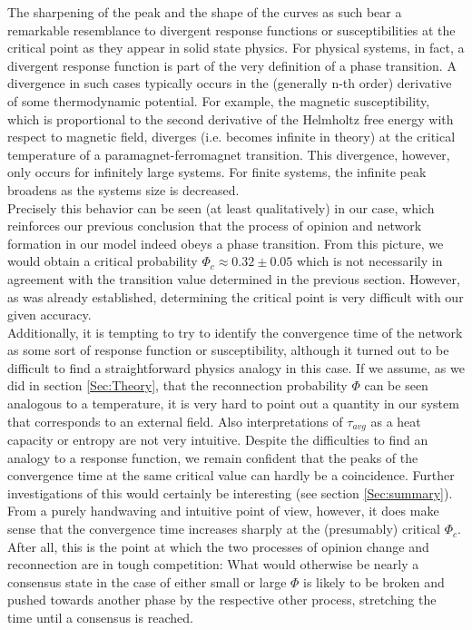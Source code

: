\documentclass[11pt]{article}
\begin{document}
The sharpening of the peak and the shape of the curves as such bear a remarkable resemblance to divergent response functions or susceptibilities at the critical point as they appear in solid state physics. For physical systems, in fact, a divergent response function is part of the very definition of a phase transition. A divergence in such cases typically occurs in the (generally n-th order) derivative of some thermodynamic potential. For example, the magnetic susceptibility, which is proportional to the second derivative of the Helmholtz free energy with respect to magnetic field, diverges (i.e. becomes infinite in theory) at the critical temperature of a paramagnet-ferromagnet transition. This divergence, however, only occurs for infinitely large systems. For finite systems, the infinite peak broadens as the systems size is decreased. \\

Precisely this behavior can be seen (at least qualitatively) in our case, which reinforces our previous conclusion that the process of opinion and network formation in our model indeed obeys a phase transition. From this picture, we would obtain a critical probability $\Phi_c \approx 0.32 \pm 0.05$ which is not necessarily in agreement with the transition value determined in the previous section. However, as was already established, determining the critical point is very difficult with our given accuracy.  \\

Additionally, it is tempting to try to identify the convergence time of the network as some sort of response function or susceptibility, although it turned out to be difficult to find a straightforward physics analogy in this case. If we assume, as we did in section \ref{Sec:Theory}, that the reconnection probability $\Phi$ can be seen analogous to a temperature, it is very hard to point out a quantity in our system that corresponds to an external field. Also interpretations of $\tau_{avg}$ as a heat capacity or entropy are not very intuitive. Despite the difficulties to find an analogy to a response function, we remain confident that the peaks of the convergence time at the same critical value can hardly be a coincidence. Further investigations of this would certainly be interesting (see section \ref{Sec:summary}). \\

From a purely handwaving and intuitive point of view, however, it does make sense that the convergence time increases sharply at the (presumably) critical $\Phi_c$. After all, this is the point at which the two processes of opinion change and reconnection are in tough competition: What would otherwise be nearly a consensus state in the case of either small or large $\Phi$ is likely to be broken and pushed towards another phase by the respective other process, stretching the time until a consensus is reached. 
\end{document}
